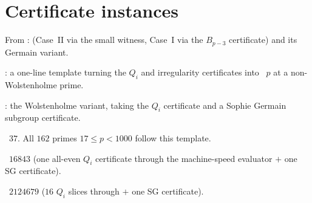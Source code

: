 \blueprintfrontmatter

\begin{abstract}
 instantiates the engine of  with
finite  certificates, yielding ~$p$
for every prime $17 \le p < 1000$ and for both Wolstenholme primes $16843$ and
$2124679$. The engine assembly theorems are external leaves.
\end{abstract}

\section{Certificate instances}

\begin{definition}\label{ext:engine}
  \leanok
  From :  (Case~II via
  the small witness, Case~I via the $B_{p-3}$ certificate) and its Germain variant.
\end{definition}

\begin{definition}\label{def:witnessfast}
  \leanok
  : a one-line template turning the 
  $Q_i$ and irregularity certificates into ~$p$ at a
  non-Wolstenholme prime.
\end{definition}

\begin{definition}\label{def:witnesssg}
  \leanok
  : the Wolstenholme variant, taking the $Q_i$ certificate
  and a Sophie Germain subgroup certificate.
\end{definition}

\begin{theorem}\label{thm:flt37}
  \leanok
  ~$37$. All $162$ primes $17 \le p < 1000$ follow this
  template.
\end{theorem}

\begin{theorem}\label{thm:flt16843}
  \leanok
  ~$16843$ (one all-even $Q_i$ certificate through the machine-speed
  evaluator  $+$ one SG certificate).
\end{theorem}

\begin{theorem}\label{thm:flt2124679}
  \leanok
  ~$2124679$ ($16$ $Q_i$ slices through  $+$ one SG
  certificate).
\end{theorem}
